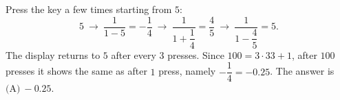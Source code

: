 Press the key a few times starting from $5$:
\[
5\ \longrightarrow\ \dfrac{1}{1-5}=-\dfrac{1}{4}\ \longrightarrow\ \dfrac{1}{1+\dfrac{1}{4}}=\dfrac{4}{5}\ \longrightarrow\ \dfrac{1}{1-\dfrac{4}{5}}=5 .
\]
The display returns to $5$ after every $3$ presses. Since $100=3\cdot33+1$, after $100$ presses it shows the same as after $1$ press, namely $-\dfrac{1}{4}=-0.25$. The answer is $\boxed{\text{(A)}\ -0.25}$.
